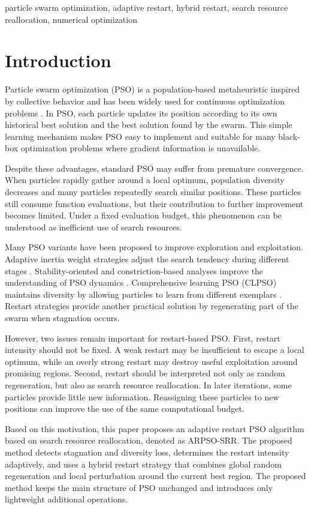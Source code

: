 \documentclass[conference]{IEEEtran}
\begin{document}
\begin{IEEEkeywords}
particle swarm optimization, adaptive restart, hybrid restart, search resource reallocation, numerical optimization
\end{IEEEkeywords}

\section{Introduction}
Particle swarm optimization (PSO) is a population-based metaheuristic inspired by collective behavior and has been widely used for continuous optimization problems \cite{b1}. In PSO, each particle updates its position according to its own historical best solution and the best solution found by the swarm. This simple learning mechanism makes PSO easy to implement and suitable for many black-box optimization problems where gradient information is unavailable.

Despite these advantages, standard PSO may suffer from premature convergence. When particles rapidly gather around a local optimum, population diversity decreases and many particles repeatedly search similar positions. These particles still consume function evaluations, but their contribution to further improvement becomes limited. Under a fixed evaluation budget, this phenomenon can be understood as inefficient use of search resources.

Many PSO variants have been proposed to improve exploration and exploitation. Adaptive inertia weight strategies adjust the search tendency during different stages \cite{b2}. Stability-oriented and constriction-based analyses improve the understanding of PSO dynamics \cite{b3}. Comprehensive learning PSO (CLPSO) maintains diversity by allowing particles to learn from different exemplars \cite{b4}. Restart strategies provide another practical solution by regenerating part of the swarm when stagnation occurs.

However, two issues remain important for restart-based PSO. First, restart intensity should not be fixed. A weak restart may be insufficient to escape a local optimum, while an overly strong restart may destroy useful exploitation around promising regions. Second, restart should be interpreted not only as random regeneration, but also as search resource reallocation. In later iterations, some particles provide little new information. Reassigning these particles to new positions can improve the use of the same computational budget.

Based on this motivation, this paper proposes an adaptive restart PSO algorithm based on search resource reallocation, denoted as ARPSO-SRR. The proposed method detects stagnation and diversity loss, determines the restart intensity adaptively, and uses a hybrid restart strategy that combines global random regeneration and local perturbation around the current best region. The proposed method keeps the main structure of PSO unchanged and introduces only lightweight additional operations.
\end{document}

